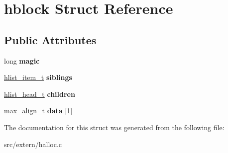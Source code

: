 \hypertarget{structhblock}{\section{hblock Struct Reference}
\label{structhblock}
}
\subsection*{Public Attributes}
\begin{DoxyCompactItemize}
\item 
\hypertarget{structhblock_a153b5da8ecf893b2c42437d48dba17cb}{long {\bfseries magic}}\label{structhblock_a153b5da8ecf893b2c42437d48dba17cb}

\item 
\hypertarget{structhblock_af8794248885632f39ebdc77d65131e36}{\hyperlink{structhlist__item}{hlist\+\_\+item\+\_\+t} {\bfseries siblings}}\label{structhblock_af8794248885632f39ebdc77d65131e36}

\item 
\hypertarget{structhblock_a06a5e75af57f90d5e61a41c2e1b2f46d}{\hyperlink{structhlist__head}{hlist\+\_\+head\+\_\+t} {\bfseries children}}\label{structhblock_a06a5e75af57f90d5e61a41c2e1b2f46d}

\item 
\hypertarget{structhblock_aaf975b14c3fd89f7e9c4df27b27eb816}{\hyperlink{unionmax__align}{max\+\_\+align\+\_\+t} {\bfseries data} \mbox{[}1\mbox{]}}\label{structhblock_aaf975b14c3fd89f7e9c4df27b27eb816}

\end{DoxyCompactItemize}


The documentation for this struct was generated from the following file\+:\begin{DoxyCompactItemize}
\item 
src/extern/halloc.\+c\end{DoxyCompactItemize}
